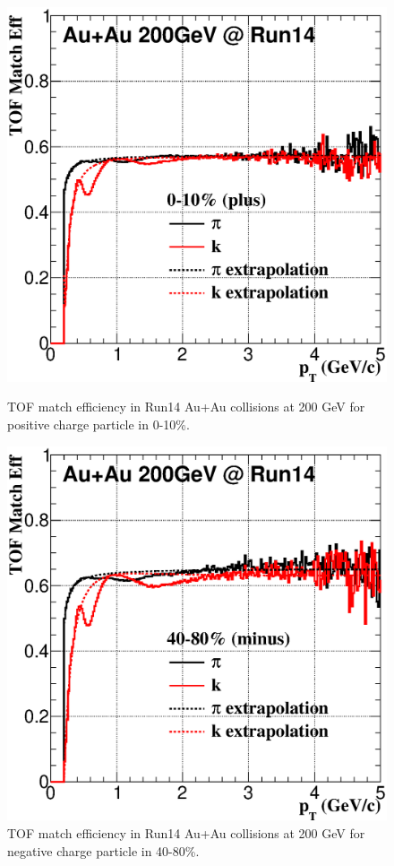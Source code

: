 \begin{figure}[htbp]
\begin{minipage}[htbp]{0.52\linewidth}
\centering
\includegraphics[width=1.0\textwidth]{figure/Run14_D0HFT/tofMatchEff_Run14_Fit_cent1.eps}
\caption{TOF match efficiency in Run14 Au+Au collisions at 200 GeV for positive charge particle in 0-10\%. \label{fig:mtof010}}
\end{minipage}
\hfill
\begin{minipage}[htbp]{0.52\linewidth}
\centering
\includegraphics[width=1.0\textwidth]{figure/Run14_D0HFT/tofMatch_minus_Eff_Run14_Fit_cent3.eps} 
\caption{TOF match efficiency in Run14 Au+Au collisions at 200 GeV for negative charge particle in 40-80\%. \label{fig:mtof4080}}
\end{minipage}
\end{figure}


